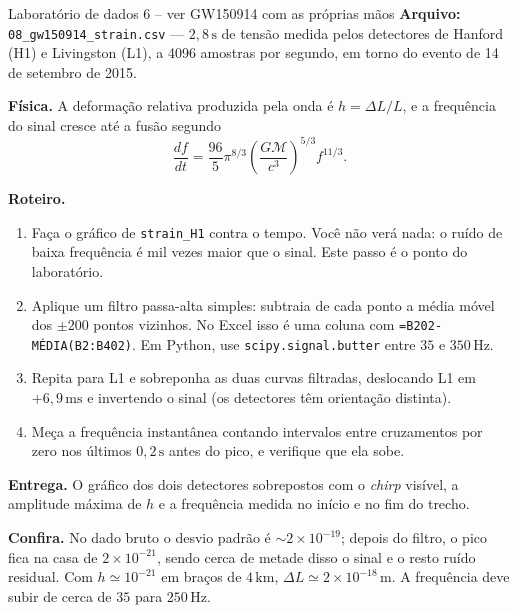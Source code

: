\documentclass[11pt,a4paper]{article}
\begin{document}
\begin{lessonblock}[borderline west={2pt}{0pt}{astroGold}]{Laboratório de dados 6 -- ver GW150914 com as próprias mãos}
\textbf{Arquivo:} \texttt{08\_gw150914\_strain.csv} --- $2{,}8\,\mathrm{s}$ de tensão medida pelos detectores de Hanford (H1) e Livingston (L1), a 4096 amostras por segundo, em torno do evento de 14 de setembro de 2015.

\textbf{Física.} A deformação relativa produzida pela onda é $h=\Delta L/L$, e a frequência do sinal cresce até a fusão segundo
\[
\frac{df}{dt}=\frac{96}{5}\pi^{8/3}\left(\frac{G\mathcal{M}}{c^{3}}\right)^{5/3}f^{11/3}.
\]

\textbf{Roteiro.}
\begin{enumerate}
\item Faça o gráfico de \texttt{strain\_H1} contra o tempo. Você não verá nada: o ruído de baixa frequência é mil vezes maior que o sinal. Este passo é o ponto do laboratório.
\item Aplique um filtro passa-alta simples: subtraia de cada ponto a média móvel dos $\pm200$ pontos vizinhos. No Excel isso é uma coluna com \texttt{=B202-MÉDIA(B2:B402)}. Em Python, use \texttt{scipy.signal.butter} entre $35$ e $350\,\mathrm{Hz}$.
\item Repita para L1 e sobreponha as duas curvas filtradas, deslocando L1 em $+6{,}9\,\mathrm{ms}$ e invertendo o sinal (os detectores têm orientação distinta).
\item Meça a frequência instantânea contando intervalos entre cruzamentos por zero nos últimos $0{,}2\,\mathrm{s}$ antes do pico, e verifique que ela sobe.
\end{enumerate}

\textbf{Entrega.} O gráfico dos dois detectores sobrepostos com o \textit{chirp} visível, a amplitude máxima de $h$ e a frequência medida no início e no fim do trecho.

\textbf{Confira.} No dado bruto o desvio padrão é $\sim2\times10^{-19}$; depois do filtro, o pico fica na casa de $2\times10^{-21}$, sendo cerca de metade disso o sinal e o resto ruído residual. Com $h\simeq10^{-21}$ em braços de $4\,\mathrm{km}$, $\Delta L\simeq2\times10^{-18}\,\mathrm{m}$. A frequência deve subir de cerca de $35$ para $250\,\mathrm{Hz}$.
\end{lessonblock}

\newpage
\end{document}
